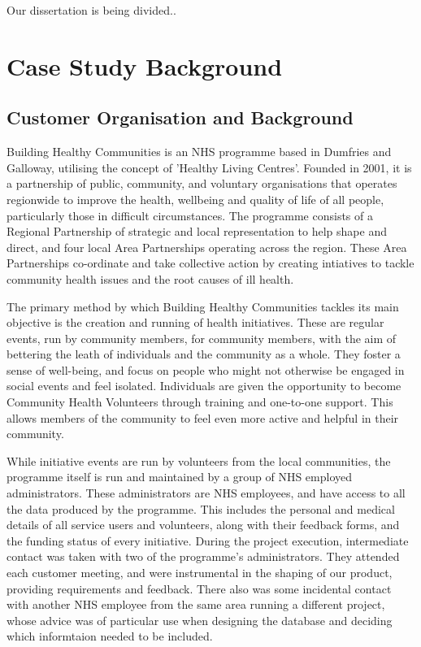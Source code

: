 \documentclass{l3proj}
\begin{document}

Our dissertation is being divided..

\section{Case Study Background}

\subsection{Customer Organisation and Background}
\label{customer}

Building Healthy Communities is an NHS programme based in Dumfries and Galloway, utilising the concept of 'Healthy Living Centres'. Founded in 2001, it is a partnership of public, community, and voluntary organisations that operates regionwide to improve the health, wellbeing and quality of life of all people, particularly those in difficult circumstances. The programme consists of a Regional Partnership of strategic and local representation to help shape and direct, and four local Area Partnerships operating across the region. These Area Partnerships co-ordinate and take collective action by creating intiatives to tackle community health issues and the root causes of ill health.

The primary method by which Building Healthy Communities tackles its main objective is the creation and running of health initiatives. These are regular events, run by community members, for community members, with the aim of bettering the leath of individuals and the community as a whole. They foster a sense of well-being, and focus on people who might not otherwise be engaged in social events and feel isolated. Individuals are given the opportunity to become Community Health Volunteers through training and one-to-one support. This allows members of the community to feel even more active and helpful in their community.

While initiative events are run by volunteers from the local communities, the programme itself is run and maintained by a group of NHS employed administrators. These administrators are NHS employees, and have access to all the data produced by the programme. This includes the personal and medical details of all service users and volunteers, along with their feedback forms, and the funding status of every initiative. During the project execution, intermediate contact was taken with two of the programme's administrators. They attended each customer meeting, and were instrumental in the shaping of our product, providing requirements and feedback. There also was some incidental contact with another NHS employee from the same area running a different project, whose advice was of particular use when designing the database and deciding which informtaion needed to be included.
\end{document}
